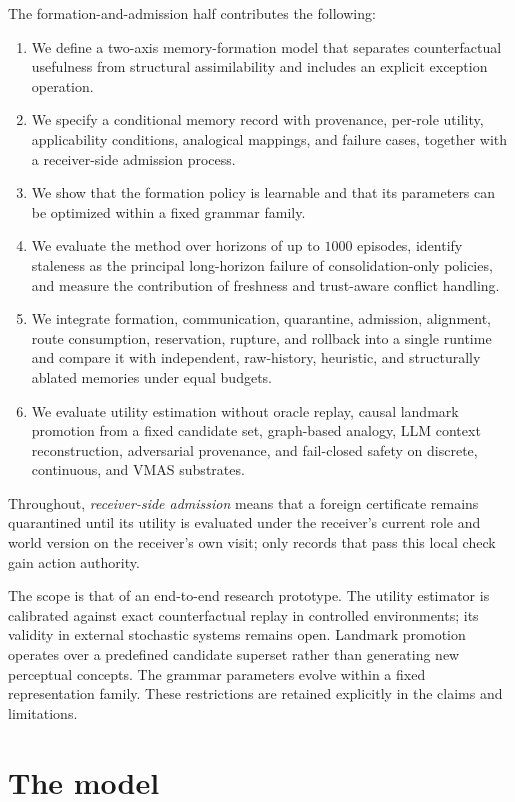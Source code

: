 \documentclass{article}
\begin{document}
The formation-and-admission half contributes the following:
\begin{enumerate}[leftmargin=20pt,itemsep=2pt,topsep=2pt]
\item We define a two-axis memory-formation model that separates
counterfactual usefulness from structural assimilability and includes
an explicit exception operation.
\item We specify a conditional memory record with provenance,
per-role utility, applicability conditions, analogical mappings, and
failure cases, together with a receiver-side admission process.
\item We show that the formation policy is learnable and that its
parameters can be optimized within a fixed grammar family.
\item We evaluate the method over horizons of up to $1000$ episodes,
identify staleness as the principal long-horizon failure of
consolidation-only policies, and measure the contribution of freshness
and trust-aware conflict handling.
\item We integrate formation, communication, quarantine, admission,
alignment, route consumption, reservation, rupture, and rollback into
a single runtime and compare it with independent, raw-history,
heuristic, and structurally ablated memories under equal budgets.
\item We evaluate utility estimation without oracle replay, causal
landmark promotion from a fixed candidate set, graph-based analogy,
LLM context reconstruction, adversarial provenance, and fail-closed
safety on discrete, continuous, and VMAS substrates.
\end{enumerate}

Throughout, \emph{receiver-side admission} means that a foreign
certificate remains quarantined until its utility is evaluated under
the receiver's current role and world version on the receiver's own
visit; only records that pass this local check gain action authority.

The scope is that of an end-to-end research prototype. The utility
estimator is calibrated against exact counterfactual replay in
controlled environments; its validity in external stochastic systems
remains open. Landmark promotion operates over a predefined candidate
superset rather than generating new perceptual concepts. The grammar
parameters evolve within a fixed representation family. These
restrictions are retained explicitly in the claims and limitations.


\section{The model}
\label{p5:sec:model}
\end{document}
